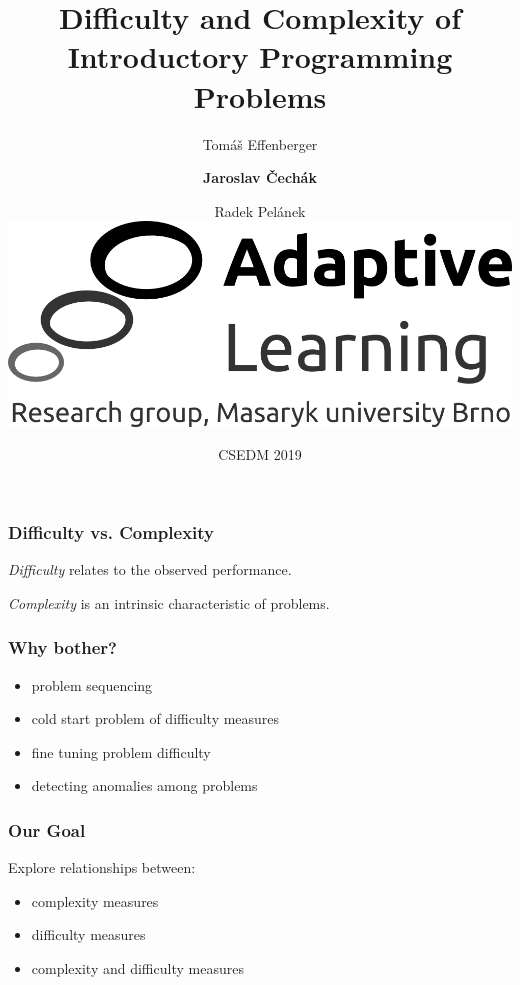 \documentclass[bigger]{beamer}
\title{Difficulty and Complexity of Introductory Programming Problems}
\author{Tom\'a\v{s} Effenberger \and \textbf{Jaroslav \v{C}ech\'ak} \and Radek Pel\'anek\\[10mm]
    \includegraphics[width=.3\linewidth]{al-logo}
}
\date{CSEDM 2019}
\begin{document}
\frame{\titlepage}

\begin{frame}
  \frametitle{Difficulty vs. Complexity}
  \begin{center}
      \emph{Difficulty} relates to the observed performance.
      
      \bigskip
      \emph{Complexity} is an intrinsic characteristic of problems.
  \end{center}

\end{frame}

\begin{frame}
  \frametitle{Why bother?}
  \begin{itemize}
      \item problem sequencing
      \item cold start problem of difficulty measures
      \item fine tuning problem difficulty
      \item detecting anomalies among problems
  \end{itemize}
\end{frame}

\begin{frame}
\frametitle{Our Goal}
Explore relationships between:
\begin{itemize}
    \item complexity measures
    \item difficulty measures
    \item complexity and difficulty measures
\end{itemize}
\end{frame}
\end{document}

